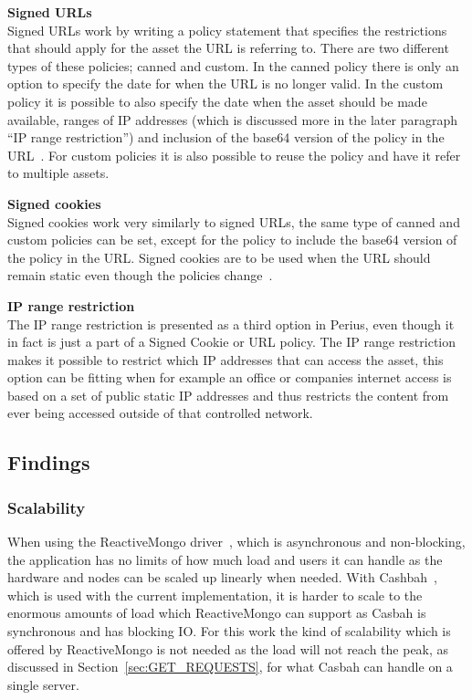 \documentclass[a4paper,12pt]{article}
\begin{document}
\par \textbf{Signed URLs} \\
Signed URLs work by writing a policy statement that specifies the restrictions that should apply for
the asset the URL is referring to. There are two different types of these policies; canned and
custom. In the canned policy there is only an option to specify the date for when the URL is no
longer valid. In the custom policy it is possible to also specify the date when the asset should be
made available, ranges of IP addresses (which is discussed more in the later paragraph ``IP range
restriction'') and inclusion of the base64 version of the policy in the URL~\cite{AWSSIGNED}. For
custom policies it is also possible to reuse the policy and have it refer to multiple assets.\\

\par \textbf{Signed cookies} \\
Signed cookies work very similarly to signed URLs, the same type of canned and custom policies can
be set, except for the policy to include the base64 version of the policy in the URL. Signed cookies
are to be used when the URL should remain static even though the policies change~\cite{AWSCOOKIES}.
\\

\par \textbf{IP range restriction} \\
The IP range restriction is presented as a third option in Perius, even though it in fact is just a
part of a Signed Cookie or URL policy. The IP range restriction makes it possible to restrict which
IP addresses that can access the asset, this option can be fitting when for example an office or
companies internet access is based on a set of public static IP addresses and thus restricts the
content from ever being accessed outside of that controlled network.

\subsection{Findings}
\subsubsection{Scalability}
When using the ReactiveMongo driver~\cite{REACTIVEMONGO}, which is asynchronous and non-blocking, 
the application has no limits of how much load and users it can handle as the hardware and nodes 
can be scaled up linearly when needed. With Cashbah~\cite{CASBAH}, which is used with the current 
implementation, it is harder to scale to the enormous amounts of load which ReactiveMongo can 
support as Casbah is synchronous and has blocking IO. For this work the kind of scalability which 
is offered by ReactiveMongo is not needed as the load will not reach the peak, as discussed in 
Section~\ref{sec:GET_REQUESTS}, for what Casbah can handle on a single server. 
\end{document}
